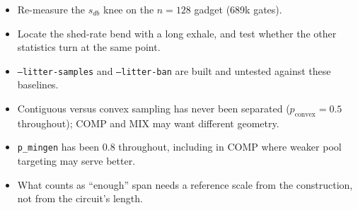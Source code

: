 \documentclass[11pt]{article}
\begin{document}
\begin{itemize}
\item Re-measure the $s_{db}$ knee on the $n=128$ gadget (689k gates).
\item Locate the shed-rate bend with a long exhale, and test whether the other
statistics turn at the same point.
\item \texttt{--litter-samples} and \texttt{--litter-ban} are built and untested
against these baselines.
\item Contiguous versus convex sampling has never been separated
($p_{\text{convex}}=0.5$ throughout); COMP and MIX may want different geometry.
\item \texttt{p\_mingen} has been $0.8$ throughout, including in COMP where
weaker pool targeting may serve better.
\item What counts as ``enough'' span needs a reference scale from the
construction, not from the circuit's length.
\end{itemize}
\end{document}
